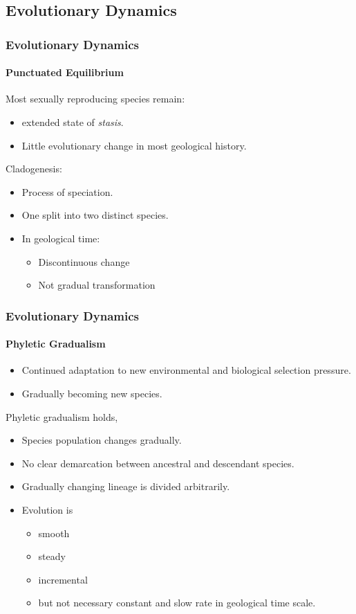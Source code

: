 \subsection{Evolutionary Dynamics}

\frame
{
	\frametitle{Evolutionary Dynamics}
	\framesubtitle{Punctuated Equilibrium}

	Most sexually reproducing species remain:
	\begin{itemize}
		\item extended state of \textit{stasis}.
		\item Little evolutionary change in most geological history.
	\end{itemize}
	
	Cladogenesis:
	\begin{itemize}
		\item Process of speciation.
		\item One split into two distinct species.
		\item In geological time:
			\begin{itemize}
				\item Discontinuous change
				\item Not gradual transformation
			\end{itemize}
	\end{itemize}
}

\frame
{
	\frametitle{Evolutionary Dynamics}
	\framesubtitle{Phyletic Gradualism}

	\begin{itemize}
		\item Continued adaptation to new environmental and biological selection pressure.
		\item Gradually becoming new species.
	\end{itemize}
	
	Phyletic gradualism holds,
	\begin{itemize}
		\item Species population changes gradually.
		\item No clear demarcation between ancestral and descendant species.
		\item Gradually changing lineage is divided arbitrarily.
		\item Evolution is 
			\begin{itemize}
				\item smooth
				\item steady
				\item incremental
				\item but not necessary constant and slow rate in geological time scale.
			\end{itemize}
	\end{itemize}
}

